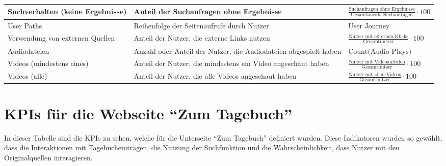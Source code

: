 \begin{xltabular}{\textwidth}{|X|X|X|}
    Suchverhalten (keine Ergebnisse) & Anteil der Suchanfragen ohne Ergebnisse & {\footnotesize \(\frac{\text{Suchanfragen ohne Ergebnisse}}{\text{Gesamtanzahl Suchanfragen}} \cdot 100\)} \\ \hline
    User Paths & Reihenfolge der Seitenaufrufe durch Nutzer & {\footnotesize \(\text{User Journey}\)} \\ \hline
    Verwendung von externen Quellen & Anteil der Nutzer, die externe Links nutzen & {\footnotesize \(\frac{\text{Nutzer mit externen Klicks}}{\text{Gesamtnutzer}} \cdot 100\)} \\ \hline
    Audiodateien & Anzahl oder Anteil der Nutzer, die Audiodateien abgespielt haben & {\footnotesize \(\text{Count(Audio Plays)}\)} \\ \hline
    Videos (mindestens eines) & Anteil der Nutzer, die mindestens ein Video angeschaut haben & {\footnotesize \(\frac{\text{Nutzer mit Videoaufrufen}}{\text{Gesamtnutzer}} \cdot 100\)} \\ \hline
    Videos (alle) & Anteil der Nutzer, die alle Videos angeschaut haben & {\footnotesize \(\frac{\text{Nutzer mit allen Videos}}{\text{Gesamtnutzer}} \cdot 100\)} \\ \hline
\end{xltabular}

\section{KPIs für die Webseite ``Zum Tagebuch''}
In dieser Tabelle sind die KPIs zu sehen, welche für die Unterseite ``Zum Tagebuch'' definiert wurden. Diese Indikatoren wurden so gewählt, dass die Interaktionen mit Tagebucheinträgen, die Nutzung der Suchfunktion und die Wahrscheinlichkeit, dass Nutzer mit den Originalquellen interagieren.

